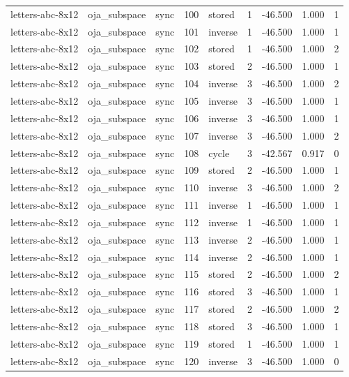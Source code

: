 \begin{tabular}{lllrlrrrr}
letters-abc-8x12 & oja\_subspace & sync & 100 & stored & 1 & -46.500 & 1.000 & 1 \\
letters-abc-8x12 & oja\_subspace & sync & 101 & inverse & 1 & -46.500 & 1.000 & 1 \\
letters-abc-8x12 & oja\_subspace & sync & 102 & stored & 1 & -46.500 & 1.000 & 2 \\
letters-abc-8x12 & oja\_subspace & sync & 103 & stored & 2 & -46.500 & 1.000 & 1 \\
letters-abc-8x12 & oja\_subspace & sync & 104 & inverse & 3 & -46.500 & 1.000 & 2 \\
letters-abc-8x12 & oja\_subspace & sync & 105 & inverse & 3 & -46.500 & 1.000 & 1 \\
letters-abc-8x12 & oja\_subspace & sync & 106 & inverse & 3 & -46.500 & 1.000 & 1 \\
letters-abc-8x12 & oja\_subspace & sync & 107 & inverse & 3 & -46.500 & 1.000 & 2 \\
letters-abc-8x12 & oja\_subspace & sync & 108 & cycle & 3 & -42.567 & 0.917 & 0 \\
letters-abc-8x12 & oja\_subspace & sync & 109 & stored & 2 & -46.500 & 1.000 & 1 \\
letters-abc-8x12 & oja\_subspace & sync & 110 & inverse & 3 & -46.500 & 1.000 & 2 \\
letters-abc-8x12 & oja\_subspace & sync & 111 & inverse & 1 & -46.500 & 1.000 & 1 \\
letters-abc-8x12 & oja\_subspace & sync & 112 & inverse & 1 & -46.500 & 1.000 & 1 \\
letters-abc-8x12 & oja\_subspace & sync & 113 & inverse & 2 & -46.500 & 1.000 & 1 \\
letters-abc-8x12 & oja\_subspace & sync & 114 & inverse & 2 & -46.500 & 1.000 & 1 \\
letters-abc-8x12 & oja\_subspace & sync & 115 & stored & 2 & -46.500 & 1.000 & 2 \\
letters-abc-8x12 & oja\_subspace & sync & 116 & stored & 3 & -46.500 & 1.000 & 1 \\
letters-abc-8x12 & oja\_subspace & sync & 117 & stored & 2 & -46.500 & 1.000 & 2 \\
letters-abc-8x12 & oja\_subspace & sync & 118 & stored & 3 & -46.500 & 1.000 & 1 \\
letters-abc-8x12 & oja\_subspace & sync & 119 & stored & 1 & -46.500 & 1.000 & 1 \\
letters-abc-8x12 & oja\_subspace & sync & 120 & inverse & 3 & -46.500 & 1.000 & 0 \\

\end{tabular}
